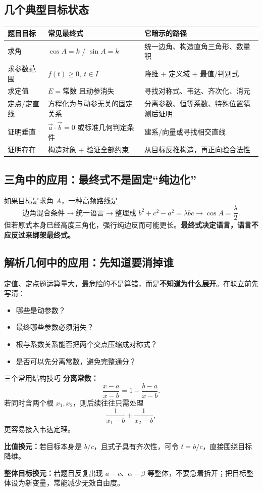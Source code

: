 \documentclass[11pt,a4paper]{ctexart}
\begin{document}
\subsection{几个典型目标状态}
\begin{longtable}{p{3.2cm}p{5.4cm}p{6.5cm}}
\toprule
\textbf{题目目标} & \textbf{常见最终式} & \textbf{它暗示的路径}\\
\midrule
求角 & $\cos A=k$ / $\sin A=k$ & 统一边角、构造直角三角形、数量积\\ \hline
求参数范围 & $f(t)\ge0,\ t\in I$ & 降维 + 定义域 + 最值/判别式\\ \hline
求定值 & $E=\text{常数}$ 且动参消失 & 寻找对称式、韦达、齐次化、消元\\ \hline
定点/定直线 & 方程化为与动参无关的固定关系 & 分离参数、恒等系数、特殊位置猜测后证明\\ \hline
证明垂直 & $\vec a\cdot\vec b=0$ 或标准几何判定条件 & 建系/向量或寻找相交直线\\ \hline
证明存在 & 构造对象 + 验证全部约束 & 从目标反推构造，再正向验合法性\\
\bottomrule
\end{longtable}

\subsection{三角中的应用：最终式不是固定“纯边化”}
如果目标是求角 $A$，一种高频路线是
\[
\text{边角混合条件}
\longrightarrow \text{统一语言}
\longrightarrow \text{整理成 }b^2+c^2-a^2=\lambda bc
\longrightarrow \cos A=\frac\lambda2.
\]
但若原式本身已经高度三角化，强行纯边反而可能更长。\textbf{最终式决定语言，语言不应反过来绑架最终式。}

\subsection{解析几何中的应用：先知道要消掉谁}
定值、定点题运算量大，最危险的不是算错，而是\textbf{不知道为什么展开}。在联立前先写清：
\begin{itemize}
  \item 哪些是动参数？
  \item 最终哪些参数必须消失？
  \item 根与系数关系能否把两个交点压缩成对称式？
  \item 是否可以先分离常数，避免完整通分？
\end{itemize}

\begin{theorembox}{三个常用结构技巧}
\textbf{分离常数：}
\[
\frac{x-a}{x-b}=1+\frac{b-a}{x-b}.
\]
若同时含两个根 $x_1,x_2$，则后续往往只需处理
\[
\frac1{x_1-b}+\frac1{x_2-b},
\]
更容易接入韦达定理。

\medskip
\textbf{比值换元：}若目标本身是 $b/c$，且式子具有齐次性，可令 $t=b/c$，直接围绕目标降维。

\medskip
\textbf{整体目标换元：}若题目反复出现 $a-c$、$\alpha-\beta$ 等整体，不要急着拆开；把目标整体设为新变量，常能减少无效自由度。
\end{theorembox}
\end{document}
